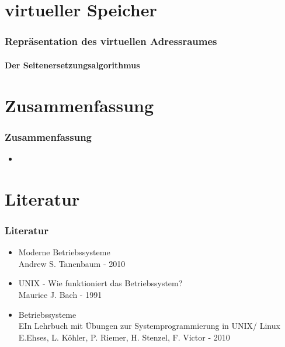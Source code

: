 \documentclass[ddcfooter]{tudbeamer}
\begin{document}
\section{virtueller Speicher}
\begin{frame}
    \frametitle{Repräsentation des virtuellen Adressraumes}
    \framesubtitle {Der Seitenersetzungsalgorithmus}
 
    
\end{frame}



\section{Zusammenfassung}
\begin{frame}
    \frametitle{Zusammenfassung}
    \begin{itemize}
         \item   
    
    
    
     \end{itemize}
    
\end{frame}


\section{Literatur}
\begin{frame}
    \frametitle{Literatur}
    \begin{itemize}
         \item  Moderne Betriebssysteme \\
        		Andrew S. Tanenbaum - 2010
	\item	 UNIX - Wie funktioniert das Betriebssystem? \\
		Maurice J. Bach - 1991
	\item Betriebssysteme\\
		EIn Lehrbuch mit Übungen zur Systemprogrammierung in UNIX/ Linux \\
		E.Ehses, L. Köhler, P. Riemer, H. Stenzel, F. Victor - 2010	
    \end{itemize}
    
\end{frame}
\end{document}
